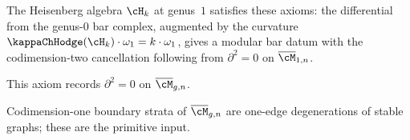 \begin{remark}
\label{rem:heisenberg-modular-bar-verification}
The Heisenberg algebra $\cH_k$ at genus~$1$ satisfies these axioms:
the differential from the genus-$0$ bar complex, augmented by the
curvature $\kappaChHodge(\cH_k) \cdot \omega_1 = k \cdot \omega_1$, gives a
modular bar datum with the codimension-two cancellation following from
$\partial^2 = 0$ on $\overline{\cM}_{1,n}$.
\end{remark}

\begin{remark}
\label{rem:codim-two-derivation}
This axiom records $\partial^2 = 0$ on $\overline{\cM}_{g,n}$.
\end{remark}

\begin{remark}
Codimension-one boundary strata of $\overline{\cM}_{g,n}$ are one-edge degenerations of stable graphs; these are the primitive input.
\end{remark}

